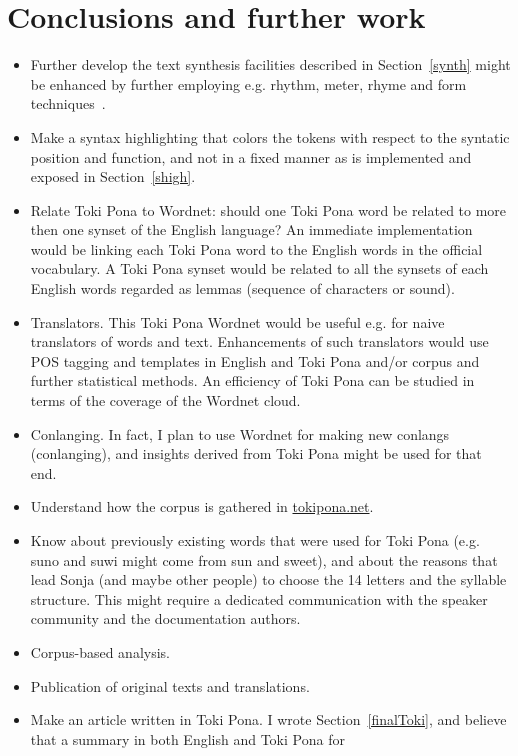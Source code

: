 \documentclass{article}
\begin{document}
\section{Conclusions and further work}\label{conc}
\begin{itemize}
  \item Further develop the text synthesis facilities described in
    Section~\ref{synth} might be enhanced by further employing e.g.
    rhythm, meter, rhyme and form techniques~\cite{wikipPoetry}.
  \item Make a syntax highlighting that colors the tokens with respect
    to the syntatic position and function, and not in a fixed manner
    as is implemented and exposed in Section~\ref{shigh}.
  \item Relate Toki Pona to Wordnet: should one Toki Pona word
    be related to more then one synset of the English language?
    An immediate implementation would be linking each Toki Pona word
    to the English words in the official vocabulary.
    A Toki Pona synset would be related to all the synsets of each English
    words regarded as lemmas (sequence of characters or sound).
  \item Translators. This Toki Pona Wordnet would be useful e.g. for naive translators
    of words and text.
    Enhancements of such translators would use POS tagging and templates
    in English and Toki Pona and/or corpus and further statistical methods.
    An efficiency of Toki Pona can be studied in terms of the coverage of
    the Wordnet cloud.
  \item Conlanging. In fact, I plan to use Wordnet for making new conlangs
    (conlanging), and insights derived from Toki Pona might be used for that end.
  \item Understand how the corpus is gathered in \url{tokipona.net}.
  \item Know about previously existing words that were used for Toki Pona
    (e.g. suno and suwi might come from sun and sweet),
    and about the reasons that lead Sonja (and maybe other people)
    to choose the 14 letters and the syllable structure.
    This might require a dedicated communication with the
    speaker community and the documentation authors.
  \item Corpus-based analysis.
  \item Publication of original texts and translations.
  \item Make an article written in Toki Pona.
    I wrote Section~\ref{finalToki}, and believe that
    a summary in both English and Toki Pona for

\end{itemize}
\end{document}

